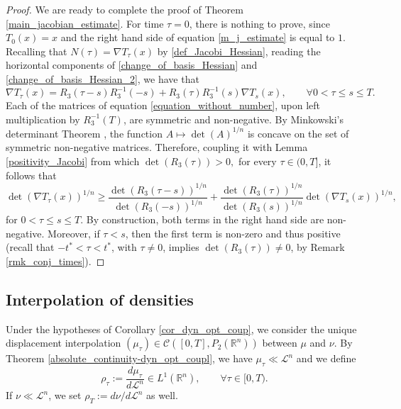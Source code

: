 \documentclass[reqno]{amsart}
\theoremstyle{plain}
\theoremstyle{definition}
\theoremstyle{remark}
\newcommand{\R}{\mathbb{R}}
\begin{document}
\begin{proof}
        We are ready to complete the proof of Theorem \ref{main_jacobian_estimate}. 
        For time $\tau=0$, there is nothing to prove, since $T_0(x)=x$ and the right hand side of equation \eqref{m_j_estimate} is equal to $1$. 
        Recalling that $N(\tau)=\nabla T_\tau(x)$ by \eqref{def_Jacobi_Hessian}, reading the horizontal components of \eqref{change_of_basis_Hessian} and \eqref{change_of_basis_Hessian_2}, we have that
		\begin{equation}\label{equation_without_number}
			\nabla T_\tau(x)=R_3(\tau-s)R_3^{-1}(-s)+R_3(\tau)R_3^{-1}(s)\nabla T_s(x),\qquad\forall 0<\tau\leq s\leq T.
		\end{equation}
		Each of the matrices of equation \eqref{equation_without_number}, upon left multiplication by $R_3^{-1}(T)$, are symmetric and non-negative. By Minkowski's determinant Theorem \cite[Theorem 4.1.8]{marcus1992survey}, the function $A\mapsto\det(A)^{1/n}$ is concave on the set of symmetric non-negative matrices. Therefore, coupling it with Lemma \ref{positivity_Jacobi} from which $\det(R_3(\tau))>0,$ for every $\tau\in(0,T]$, it follows that 
		\begin{equation}
			\det(\nabla T_\tau(x))^{1/n}\geq\frac{\det(R_3(\tau-s))^{1/n}}{\det(R_3(-s))^{1/n}}+\frac{\det(R_3(\tau))^{1/n}}{\det(R_3(s))^{1/n}}\det(\nabla T_s(x))^{1/n},
		\end{equation}
		for $0<\tau\leq s\leq T$. By construction, both terms in the right hand side are non-negative. Moreover, if $\tau<s$, then the first term is non-zero and thus positive (recall that $-t^*<\tau<t^*$, with $\tau\neq 0$, implies $\det(R_3(\tau))\neq 0$, by Remark \ref{rmk_conj_times}).
		\end{proof}
        
        \subsection{Interpolation of densities}
        Under the hypotheses of Corollary \ref{cor_dyn_opt_coup}, we consider the unique displacement interpolation $(\mu_\tau)\in\mathcal{C}([0,T],P_2(\mathbb{R}^n))$ between $\mu$ and $\nu$. By Theorem \ref{absolute_continuity-dyn_opt_coupl}, we have $\mu_\tau\ll\mathscr{L}^n$ and we define
		\begin{equation}
			\rho_\tau:=\frac{d\mu_\tau}{d\mathscr{L}^n}\in L^1(\R^n),\qquad\forall \tau\in[0,T).
		\end{equation}
		If $\nu\ll\mathscr{L}^n$, we set $\rho_T:=d\nu/d\mathscr{L}^n$ as well.
        
\end{document}
